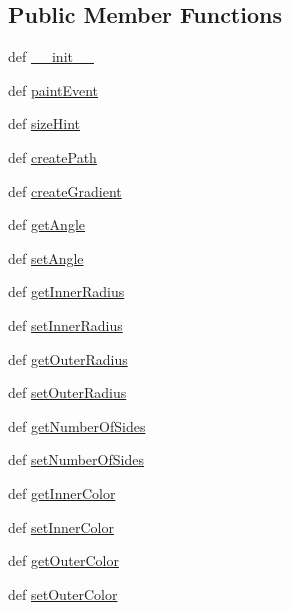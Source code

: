 \subsection*{Public Member Functions}
\begin{DoxyCompactItemize}
\item 
def \hyperlink{classpolygonwidget_1_1PolygonWidget_acfef79ca76e10468a63fc5c67696259a}{\+\_\+\+\_\+init\+\_\+\+\_\+}
\item 
def \hyperlink{classpolygonwidget_1_1PolygonWidget_af5151edd7ee7ec3eeb7387ca2868c856}{paint\+Event}
\item 
def \hyperlink{classpolygonwidget_1_1PolygonWidget_aac3dc67902de80f17454743b2847ff48}{size\+Hint}
\item 
def \hyperlink{classpolygonwidget_1_1PolygonWidget_afa682fff25e8c449054d92c89c308c84}{create\+Path}
\item 
def \hyperlink{classpolygonwidget_1_1PolygonWidget_ae0c0d552e1d3db37c122a0dd12a05a6f}{create\+Gradient}
\item 
def \hyperlink{classpolygonwidget_1_1PolygonWidget_a892b2fd36feedbbc415d7d1b925e2ca9}{get\+Angle}
\item 
def \hyperlink{classpolygonwidget_1_1PolygonWidget_a187af97917838ba0d27688a94305380e}{set\+Angle}
\item 
def \hyperlink{classpolygonwidget_1_1PolygonWidget_ace5b874afe41ef104f3bb5dfa74bbef6}{get\+Inner\+Radius}
\item 
def \hyperlink{classpolygonwidget_1_1PolygonWidget_acacc82f9ad7204cbf5d356f9f8b9b232}{set\+Inner\+Radius}
\item 
def \hyperlink{classpolygonwidget_1_1PolygonWidget_a7220c22bfef31eca796fe9677bc97fc1}{get\+Outer\+Radius}
\item 
def \hyperlink{classpolygonwidget_1_1PolygonWidget_a4afcd209d70db5165df3b2d2aa319a14}{set\+Outer\+Radius}
\item 
def \hyperlink{classpolygonwidget_1_1PolygonWidget_ac6fb002a2ec8d53197ed8c9faa0759d7}{get\+Number\+Of\+Sides}
\item 
def \hyperlink{classpolygonwidget_1_1PolygonWidget_a82f59e262d0ad45f4570c5febf922a97}{set\+Number\+Of\+Sides}
\item 
def \hyperlink{classpolygonwidget_1_1PolygonWidget_a3fe29a6cbf3ec8c244be4ef87d4b9729}{get\+Inner\+Color}
\item 
def \hyperlink{classpolygonwidget_1_1PolygonWidget_a969cc7cf0c212bf6c450dce615471830}{set\+Inner\+Color}
\item 
def \hyperlink{classpolygonwidget_1_1PolygonWidget_a0169838801299ad357aaef64a473c09a}{get\+Outer\+Color}
\item 
def \hyperlink{classpolygonwidget_1_1PolygonWidget_a48e99f13441357fec54a0df8a5d2a381}{set\+Outer\+Color}
\end{DoxyCompactItemize}
